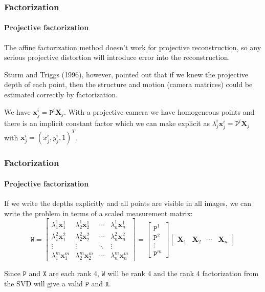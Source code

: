 \documentclass[aspectratio=169]{beamer}
\renewcommand{\vec}[1]{\boldsymbol{#1}}
\newcommand{\mat}[1]{\mathtt{#1}}
\begin{document}
\begin{frame}
\frametitle{Factorization}
\framesubtitle{Projective factorization}

The affine factorization method doesn't work for \alert{projective
reconstruction}, so any serious projective distortion will introduce
error into the reconstruction.

\medskip

Sturm and Triggs (1996), however, pointed out that if we knew the
\alert{projective depth} of each point, then the structure and motion
(camera matrices) could be estimated correctly by factorization.

\medskip

We have $\vec{x}_j^i=\mat{P}^i\vec{X}_j$.  With a projective camera we have
homogeneous points and there is an implicit constant factor which we
can make explicit as $\lambda_j^i\vec{x}_j^i=\mat{P}^i\vec{X}_j$
with $\vec{x}_j^i=(x_j^i,y_j^i,1)^T$.

\end{frame}

\begin{frame}
\frametitle{Factorization}
\framesubtitle{Projective factorization}

If we write the depths explicitly and all points are visible in all
images, we can write the problem in terms of a \alert{scaled
measurement matrix}:
\begin{equation*}
\mat{W} =
\begin{bmatrix}
\lambda_1^1\vec{x}_1^1 & \lambda_2^1\vec{x}_2^1 & \cdots &
\lambda_n^1\vec{x}_n^1 \\
\lambda_1^2\vec{x}_1^2 & \lambda_2^2\vec{x}_2^2 & \cdots &
\lambda_n^2\vec{x}_n^2 \\
\vdots & \vdots & \ddots & \vdots \\
\lambda_1^m\vec{x}_1^m & \lambda_2^m\vec{x}_2^m & \cdots &
\lambda_n^m\vec{x}_n^m \end{bmatrix} =
\begin{bmatrix} \mat{P}^1 \\ \mat{P}^2 \\ \vdots \\ \mat{P}^m
\end{bmatrix} \begin{bmatrix} \vec{X}_1 & \vec{X}_2 & \cdots &
\vec{X}_n \end{bmatrix}
\end{equation*}

\medskip

Since $\mat{P}$ and $\mat{X}$ are each rank 4, $\mat{W}$ will be rank
4 and the \alert{rank 4 factorization} from the SVD will give a valid $\mat{P}$
and $\mat{X}$.

\end{frame}
\end{document}
